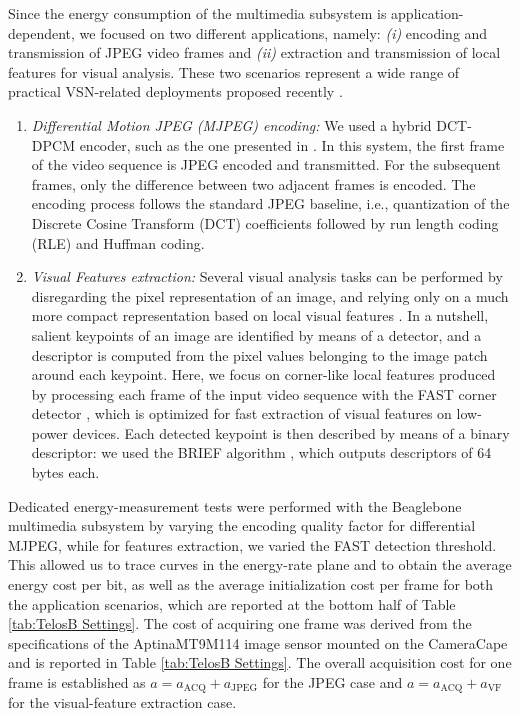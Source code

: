 \documentclass[twocolumn,english]{IEEEtran}
\theoremstyle{plain}
\theoremstyle{definition}
\begin{document}
Since the energy consumption of the multimedia subsystem is application-dependent,
we focused on two different applications, namely: \textit{(i)} encoding
and transmission of JPEG video frames and \textit{(ii)} extraction
and transmission of local features for visual analysis. These two
scenarios represent a wide range of practical VSN-related deployments
proposed recently \cite{charfi2009VSN,kwon2009imagesensor,mingorance2010efficient,paniga2011experimental,rahimi2005cyclops,redondi2012rate,yu2004energy,DBLP:conf/MMSP/RedondiBCT}. 

\begin{enumerate}[leftmargin=*] 
\item

\textit{Differential Motion JPEG (MJPEG) encoding:} We used a hybrid
DCT-DPCM encoder, such as the one presented in \cite{paniga2011experimental}.
In this system, the first frame of the video sequence is JPEG encoded
and transmitted. For the subsequent frames, only the difference between
two adjacent frames is encoded. The encoding process follows the standard
JPEG baseline, i.e., quantization of the Discrete Cosine Transform
(DCT) coefficients followed by run length coding (RLE) and Huffman
coding. 

\item

\textit{Visual Features extraction: }Several visual analysis tasks
can be performed by disregarding the pixel representation of an image,
and relying only on a much more compact representation based on local
visual features \cite{DBLP:journals/ijcv/Lowe04}. In a nutshell,
salient keypoints of an image are identified by means of a detector,
and a descriptor is computed from the pixel values belonging to the
image patch around each keypoint. Here, we focus on corner-like local
features produced by processing each frame of the input video sequence
with the FAST corner detector \cite{rosten_2008_faster}, which is
optimized for fast extraction of visual features on low-power devices.
Each detected keypoint is then described by means of a binary descriptor:
we used the BRIEF algorithm \cite{calonder2010brief}, which outputs
descriptors of 64 bytes each. 

\end{enumerate}

Dedicated energy-measurement tests were performed with the Beaglebone
multimedia subsystem by varying the encoding quality factor for differential
MJPEG, while for features extraction, we varied the FAST detection
threshold. This allowed us to trace curves in the energy-rate plane
and to obtain the average energy cost per bit, as well as the average
initialization cost per frame for both the application scenarios,
which are reported at the bottom half of Table \ref{tab:TelosB Settings}.
The cost of acquiring one frame was derived from the specifications
of the AptinaMT9M114 image sensor mounted on the CameraCape and is
reported in Table \ref{tab:TelosB Settings}. The overall acquisition
cost for one frame is established as $a=a_{\textrm{ACQ}}+a_{\textrm{JPEG}}$
for the JPEG case and $a=a_{\textrm{ACQ}}+a_{\textrm{VF}}$ for the
visual-feature extraction case. 
\end{document}
